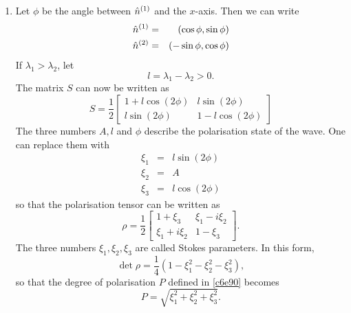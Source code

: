 \begin{enumerate}
\item Let $\phi$ be the angle between $\hat{n}^{(1)}$ and the $x$-axis. Then we can 
write
\begin{eqnarray}
\hat{n}^{(1)} &=& (\cos\phi, \sin\phi) \label{c6e100} \\
\hat{n}^{(2)} &=& (-\sin\phi, \cos\phi) \label{c6e101}
\end{eqnarray}
If $\lambda_1 > \lambda_2$, let
\begin{equation}\label{c6e102}
l = \lambda_1 - \lambda_2 > 0.
\end{equation}
The matrix $S$ can now be written as
\begin{equation}\label{c6e103}
S = \frac{1}{2}\begin{bmatrix}
1 + l\cos(2\phi) & l\sin(2\phi) \\
l\sin(2\phi) & 1 - l\cos(2\phi)
\end{bmatrix}
\end{equation}
The three numbers $A, l$ and $\phi$ describe the polarisation state of the wave.
One can replace them with
\begin{eqnarray}
\xi_1 &=& l\sin(2\phi) \label{c6e104} \\
\xi_2 &=& A \label{c6e105} \\
\xi_3 &=& l\cos(2\phi) \label{c6e106}
\end{eqnarray}
so that the polarisation tensor can be written as
\begin{equation}\label{c6e107}
\rho = \frac{1}{2}\begin{bmatrix}
1 + \xi_3 & \xi_1 - i\xi_2 \\
\xi_1 + i\xi_2 & 1 - \xi_3
\end{bmatrix}.
\end{equation}
The three numbers $\xi_1, \xi_2, \xi_3$ are called Stokes parameters. In this form,
\begin{equation}\label{c6e108}
\det\rho = \frac{1}{4}(1 - \xi_1^2 - \xi_2^2 - \xi_3^2),
\end{equation}
so that the degree of polarisation $P$ defined in \eqref{c6e90} becomes
\begin{equation}\label{c6e109}
P = \sqrt{\xi_1^2 + \xi_2^2 + \xi_3^2}.
\end{equation}


\end{enumerate}
